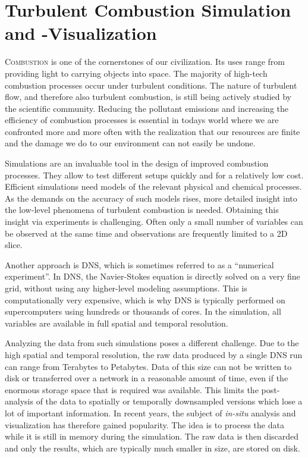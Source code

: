 \chapter{Turbulent Combustion Simulation and -Visualization} %
\label{cha:turbulent_combustion}
%
\lettrine[lines=3, lhang=0.05]{C}{ombustion} is one of the cornerstones of our
civilization.
%
Its uses range from providing light to carrying objects into space.
%
The majority of high-tech combustion processes occur under turbulent conditions.
%
The nature of turbulent flow, and therefore also turbulent combustion, is still
being actively studied by the scientific community.
%
Reducing the pollutant emissions and increasing the efficiency of combustion
processes is essential in todays world where we are confronted more and more
often with the realization that our resources are finite and the damage we do to
our environment can not easily be undone.
%

%
Simulations are an invaluable tool in the design of improved combustion
processes.
%
They allow to test different setups quickly and for a relatively low cost.
%
Efficient simulations need models of the relevant physical and chemical
processes.
%
As the demands on the accuracy of such models rises, more detailed insight into
the low-level phenomena of turbulent combustion is needed.
%
Obtaining this insight via experiments is challenging.
%
Often only a small number of variables can be observed at the same time and
observations are frequently limited to a \ac{2D} slice.
%

%
Another approach is \acf{DNS}, which is sometimes referred to as a ``numerical
experiment''.
%
In \ac{DNS}, the Navier-Stokes equation is directly solved on a very fine grid,
without using any higher-level modeling assumptions.
%
This is computationally very expensive, which is why \ac{DNS} is typically
performed on supercomputers using hundreds or thousands of cores.
%
In the simulation, all variables are available in full spatial and temporal
resolution.
%

%
Analyzing the data from such simulations poses a different challenge.
%
Due to the high spatial and temporal resolution, the raw data produced by a
single \ac{DNS} run can range from Terabytes to Petabytes.
%
Data of this size can not be written to disk or transferred over a network in a
reasonable amount of time, even if the enormous storage space that is required
was available.
%
This limits the post-analysis of the data to spatially or temporally downsampled
versions which lose a lot of important information.
%
In recent years, the subject of \emph{in-situ} analysis and visualization has
therefore gained popularity.
%
The idea is to process the data while it is still in memory during the
simulation.
%
The raw data is then discarded and only the results, which are typically much
smaller in size, are stored on disk.
%


